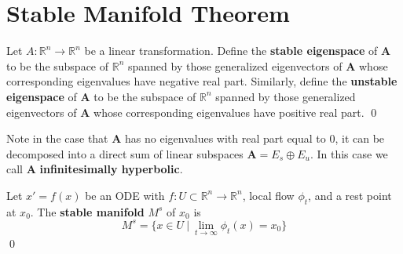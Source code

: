 \section{Stable Manifold Theorem}
\label{stable_manifold_theorem}

 \begin{definition}
 	Let $A: \mathbb{R}^n \to \mathbb{R}^n$ be a linear transformation. Define the \textbf{stable eigenspace} of $\mathbf{A}$ to be the subspace of $\mathbb{R}^n$ spanned by those generalized eigenvectors of $\mathbf{A}$ whose corresponding eigenvalues have negative real part. Similarly, define the \textbf{unstable eigenspace} of $\mathbf{A}$ to be the subspace of $\mathbb{R}^n$ spanned by those generalized eigenvectors of $\mathbf{A}$ whose corresponding eigenvalues have positive real part. %
 	\qed
 \end{definition}
 
 Note in the case that $\mathbf{A}$ has no eigenvalues with real part equal to 0, it can be decomposed into a direct sum of linear subspaces $\mathbf{A} = E_s \oplus E_u$. In this case we call $\mathbf{A}$ \textbf{infinitesimally hyperbolic}.
 
 \begin{definition}
 	Let $x' = f(x)$ be an ODE with $f:U \subset \mathbb{R}^n \to \mathbb{R}^n$, local flow $\phi_t$, and a rest point at $x_0$. The \textbf{stable manifold} $M^s$ %
 	of $x_0$ is %
 	$$M^s = \{x \in U ~|~ \lim\limits_{t \to \infty} \phi_t(x)= x_0\}$$ 
 	\qed
 \end{definition}
 
 

